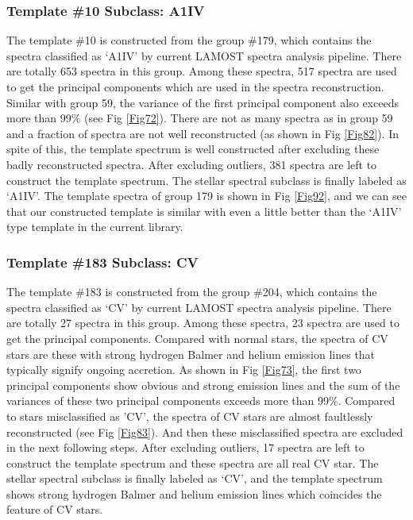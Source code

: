 \documentclass[manuscript]{aastex}
\begin{document}
\subsubsection{Template \#10 Subclass: A1IV}
The template \#10 is constructed from the group \#179,
which contains the spectra classified as `A1IV' by current LAMOST spectra analysis pipeline.
There are totally 653 spectra in this group.
Among these spectra, 517 spectra are used to get the principal components which are used in the spectra reconstruction.
Similar with group 59, the variance of the first  principal component also exceeds more than 99\%  (see Fig \ref{Fig72}).
There are not as many spectra as in group 59 and a fraction of  spectra are not well reconstructed (as shown in Fig \ref{Fig82}).
In spite of this, the template spectrum is well constructed after excluding these badly reconstructed spectra.
After excluding outliers, 381 spectra are left to construct the template spectrum.
The stellar spectral subclass is finally labeled as `A1IV'.
The template spectra of group 179 is  shown in Fig \ref{Fig92},
and we can see that our constructed template is similar with even  a little better than the `A1IV' type template in  the current library.



\subsubsection{Template \#183 Subclass: CV}
The template \#183 is constructed from the group \#204,
which contains the spectra classified as `CV' by current LAMOST spectra analysis pipeline.
There are totally 27 spectra in this group.
Among these spectra, 23 spectra are used to get the principal components.
Compared with normal stars, the spectra of CV stars are these with strong hydrogen Balmer and helium emission lines that typically signify ongoing accretion.
As shown in Fig \ref{Fig73}, the first two principal components show obvious and strong emission lines and the sum of the variances of these two  principal components  exceeds more than 99\%.
Compared to stars misclassified as 'CV', the spectra of CV stars are almost faultlessly reconstructed (see Fig \ref{Fig83}).
And then these misclassified spectra are excluded in the next following steps.
After excluding outliers, 17 spectra are left to construct the template spectrum and these spectra are all real CV star.
The stellar spectral subclass is finally labeled as `CV',
and the template spectrum shows strong hydrogen Balmer and helium emission lines which coincides the feature of CV stars.
\end{document}
